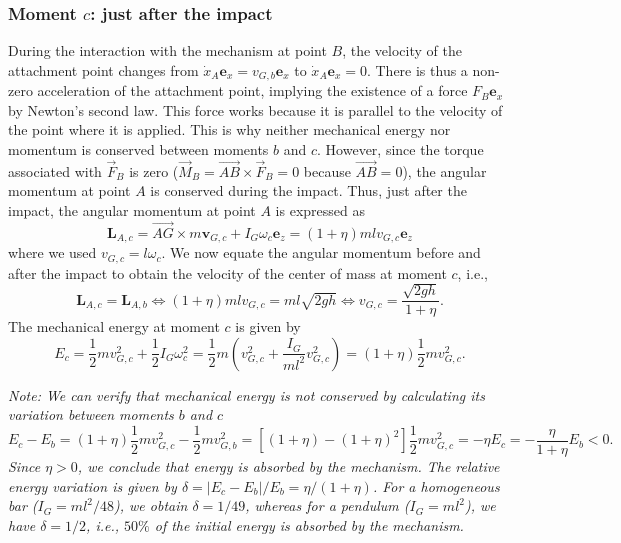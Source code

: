 \documentclass[11pt,a4paper]{exam}
\newcommand{\exACDH}{\bm e_x}
\newcommand{\ezACDH}{\bm e_z}
\newcommand{\noteACDH}[1]{\textit{Note: #1}}
\begin{document}
\begin{parts}
    \subsubsection*{Moment $c$: just after the impact}
    During the interaction with the mechanism at point $B$, the velocity of the attachment point changes from $\dot x_{A}\exACDH =v_{G,b}\exACDH$ to $\dot x_{A}\exACDH =0$.
    There is thus a non-zero acceleration of the attachment point, implying the existence of a force $F_B\exACDH$ by Newton's second law.
    This force works because it is parallel to the velocity of the point where it is applied.
    This is why neither mechanical energy nor momentum is conserved between moments $b$ and $c$.
    However, since the torque associated with $\vec F_B$ is zero ($\vec M_B=\overrightarrow{AB}\times\vec F_B = 0$ because $\overrightarrow{AB}=0$), the angular momentum at point $A$ is conserved during the impact.
    Thus, just after the impact, the angular momentum at point $A$ is expressed as
    \begin{equation}
        \bm L_{A,c} =\overrightarrow{AG}\times m \bm v_{G,c} + I_G \omega_c \ezACDH = (1+\eta)mlv_{G,c}\ezACDH
    \end{equation}
    where we used $v_{G,c} =  l\omega_c$.
    We now equate the angular momentum before and after the impact to obtain the velocity of the center of mass at moment $c$, i.e.,
    \begin{equation}
        \bm L_{A,c} = \bm L_{A,b} \Leftrightarrow (1+\eta)mlv_{G,c} = ml\sqrt{2gh} \Leftrightarrow v_{G,c}= \frac{\sqrt{2gh}}{1+\eta}.
        \label{eq:mcin_A_c}
    \end{equation}
    The mechanical energy at moment $c$ is given by
    \begin{equation}
    E_{c} = \frac{1}{2}mv_{G,c}^2 + \frac{1}{2}I_G\omega_c^2 = \frac{1}{2}m\left(v_{G,c}^2 + \frac{I_G}{ml^2}v_{G,c}^2\right) = (1+\eta)\frac{1}{2}m v_{G,c}^2.
    \end{equation}
    
    \noteACDH{We can verify that mechanical energy is not conserved by calculating its variation between moments $b$ and $c$
    $$
    E_{c} - E_{b} = (1+\eta)\frac{1}{2}m v_{G,c}^2 - \frac{1}{2}mv_{G,b}^2 =\left[(1+\eta) - (1+\eta)^2\right]\frac{1}{2}m v_{G,c}^2 = -\eta E_{c} = -\frac{\eta}{1+\eta}E_b < 0.
    $$
    Since $\eta>0$, we conclude that energy is absorbed by the mechanism.
    The relative energy variation is given by $\delta = |E_c-E_b|/E_b = \eta/(1+\eta)$. 
    For a homogeneous bar ($I_G = ml^2/48$), we obtain $\delta = 1/49$, whereas for a pendulum ($I_G=ml^2$), we have $\delta = 1/2$, i.e., $50\%$ of the initial energy is absorbed by the mechanism.}
    

\end{parts}
\end{document}
